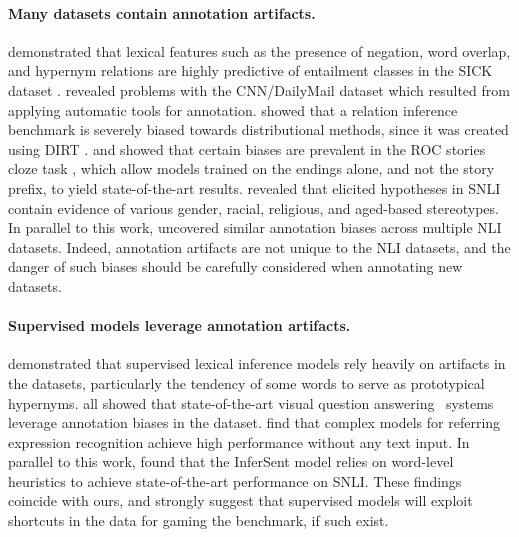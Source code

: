 \paragraph{Many datasets contain annotation artifacts.}
\citet{Lai2014-cd} demonstrated that lexical features such as the presence of negation, word overlap, and hypernym relations are highly predictive of entailment classes in the SICK dataset \cite{Marelli:2014}. \citet{Chen:2016} revealed problems with the CNN/DailyMail dataset \cite{Hermann:2015} which resulted from applying automatic tools for annotation. 
\citet{Levy:2016} showed that a relation inference benchmark \cite{Zeichner:2012} is severely biased towards distributional methods, since it was created using DIRT \cite{Lin:2001}.
\citet{Schwartz:2017} and \citet{Cai:2017} showed that certain biases are prevalent in the ROC stories cloze task \cite{Mostafazadeh:2016}, which allow models trained on the endings alone, and not the story prefix, to yield state-of-the-art results. \citet{Rudinger2017SocialBI} revealed that elicited hypotheses in SNLI contain evidence of various gender, racial, religious, and aged-based stereotypes.  In parallel to this work, \citet{hypothesis-only-nli} uncovered similar annotation biases across multiple NLI datasets. Indeed, annotation artifacts are not unique to the NLI datasets, and the danger of such biases should be carefully considered when annotating new datasets.

\paragraph{Supervised models leverage annotation artifacts.}
 \citet{Levy:2015} demonstrated that supervised lexical inference models rely heavily on artifacts in the datasets, particularly the tendency of some words to serve as prototypical hypernyms. \citet{Agrawal:16,Jabri:2016,Goyal:17} all showed that state-of-the-art visual question answering~\cite{Antol:15} systems leverage annotation biases in the dataset. \citet{Cirik:18} find that complex models for referring expression recognition achieve high performance without any text input. In parallel to this work, \citet{Dasgupta2018-ry} found that the InferSent model \cite{conneau2017supervised} relies on word-level heuristics to achieve state-of-the-art performance on SNLI. These findings coincide with ours, and strongly suggest that supervised models will exploit shortcuts in the data for gaming the benchmark, if such exist.

